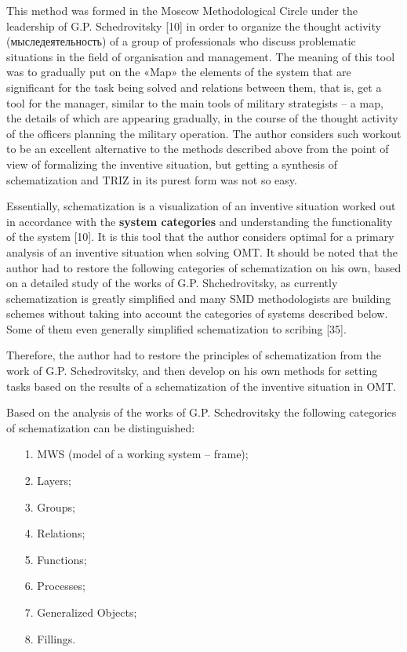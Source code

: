 \documentclass[11pt,a4paper]{book}
\begin{document}
This method was formed in the Moscow Methodological Circle under the
leadership of G.P. Schedrovitsky [10] in order to organize the thought
activity (\foreignlanguage{russian}{мыследеятельность}) of a group of
professionals who discuss problematic situations in the field of organisation
and management. The meaning of this tool was to gradually put on the «Map» the
elements of the system that are significant for the task being solved and
relations between them, that is, get a tool for the manager, similar to the
main tools of military strategists -- a map, the details of which are
appearing gradually, in the course of the thought activity of the officers
planning the military operation. The author considers such workout to be an
excellent alternative to the methods described above from the point of view of
formalizing the inventive situation, but getting a synthesis of schematization
and TRIZ in its purest form was not so easy.

Essentially, schematization is a visualization of an inventive situation
worked out in accordance with the \textbf{system categories} and understanding
the functionality of the system [10]. It is this tool that the author
considers optimal for a primary analysis of an inventive situation when
solving OMT. It should be noted that the author had to restore the following
categories of schematization on his own, based on a detailed study of the
works of G.P. Shchedrovitsky, as currently schematization is greatly
simplified and many SMD methodologists are building schemes without taking
into account the categories of systems described below.  Some of them even
generally simplified schematization to scribing [35].

Therefore, the author had to restore the principles of schematization from the
work of G.P. Schedrovitsky, and then develop on his own methods for setting
tasks based on the results of a schematization of the inventive situation in
OMT.

Based on the analysis of the works of G.P. Schedrovitsky the following
categories of schematization can be distinguished:
\begin{itemize}[noitemsep]
\item[1.] MWS (model of a working system -- frame);
\item[2.] Layers;
\item[3.] Groups;
\item[4.] Relations;
\item[5.] Functions;
\item[6.] Processes;
\item[7.] Generalized Objects;
\item[8.] Fillings.
\end{itemize}
\end{document}
